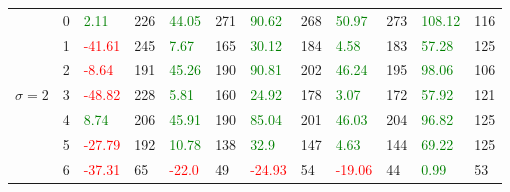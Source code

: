 \begin{table}[!htb]
\begin{adjustwidth}{-0.8in}{-0.9in}
\begin{tabular}{|p{4em}|p{2em}|p{3em}|p{3em}|p{3em}|p{3em}|p{3em}|p{3em}|p{3em}|p{3em}|p{3em}|p{3em}|}
            & 0 & \textcolor{green}{2.11} & 226 & \textcolor{green}{44.05} & 271 & \textcolor{green}{90.62} & 268 & \textcolor{green}{50.97} & 273 & \textcolor{green}{108.12} & 116\\\cline{3-12}
            & 1 & \textcolor{red}{-41.61} & 245 & \textcolor{green}{7.67} & 165 & \textcolor{green}{30.12} & 184 & \textcolor{green}{4.58} & 183 & \textcolor{green}{57.28} & 125\\\cline{3-12}
            & 2 & \textcolor{red}{-8.64} & 191 & \textcolor{green}{45.26} & 190 & \textcolor{green}{90.81} & 202 & \textcolor{green}{46.24} & 195 & \textcolor{green}{98.06} & 106\\\cline{3-12}
            $\sigma=2$& 3 & \textcolor{red}{-48.82} & 228 & \textcolor{green}{5.81} & 160 & \textcolor{green}{24.92} & 178 & \textcolor{green}{3.07} & 172 & \textcolor{green}{57.92} & 121\\\cline{3-12}
            & 4 & \textcolor{green}{8.74} & 206 & \textcolor{green}{45.91} & 190 & \textcolor{green}{85.04} & 201 & \textcolor{green}{46.03} & 204 & \textcolor{green}{96.82} & 125\\\cline{3-12}
            & 5 & \textcolor{red}{-27.79} & 192 & \textcolor{green}{10.78} & 138 & \textcolor{green}{32.9} & 147 & \textcolor{green}{4.63} & 144 & \textcolor{green}{69.22} & 125\\\cline{3-12}
            & 6 & \textcolor{red}{-37.31} & 65 & \textcolor{red}{-22.0} & 49 & \textcolor{red}{-24.93} & 54 & \textcolor{red}{-19.06} & 44 & \textcolor{green}{0.99} & 53\\\hline\hline
            

\end{tabular}
\end{adjustwidth}
\end{table}
